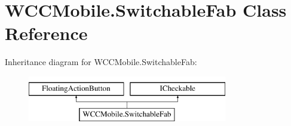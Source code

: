 \hypertarget{class_w_c_c_mobile_1_1_switchable_fab}{}\section{W\+C\+C\+Mobile.\+Switchable\+Fab Class Reference}
\label{class_w_c_c_mobile_1_1_switchable_fab}
Inheritance diagram for W\+C\+C\+Mobile.\+Switchable\+Fab\+:\begin{figure}[H]
\begin{center}
\leavevmode
\includegraphics[height=2.000000cm]{class_w_c_c_mobile_1_1_switchable_fab}
\end{center}
\end{figure}
